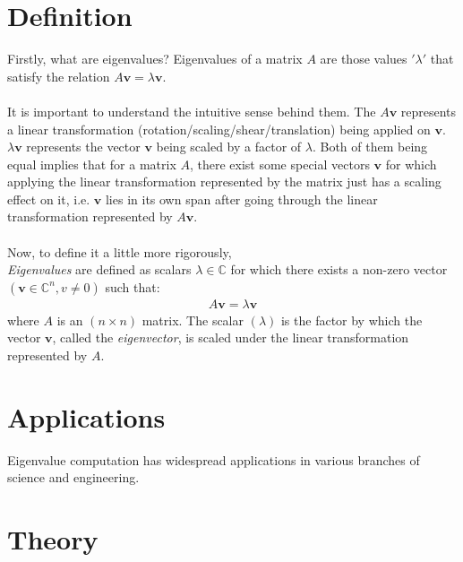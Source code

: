 \documentclass[12pt]{article}
\begin{document}
\section{Definition}
Firstly, what are eigenvalues? Eigenvalues of a matrix $A$ are those values $'\lambda'$ that satisfy the relation $A\mathbf{v}=\lambda\mathbf{v}$.\\\\
It is important to understand the intuitive sense behind them. The $A\mathbf{v}$ represents a linear transformation (rotation/scaling/shear/translation) being applied on $\mathbf{v}$. $\lambda\mathbf{v}$ represents the vector $\mathbf{v}$ being scaled by a factor of $\lambda$. Both of them being equal implies that for a matrix $A$, there exist some special vectors $\mathbf{v}$ for which applying the linear transformation represented by the matrix just has a scaling effect on it, i.e. $\mathbf{v}$ lies in its own span after going through the linear transformation represented by $A\mathbf{v}$.\\\\

Now, to define it a little more rigorously,\\ 
\textit{Eigenvalues} are defined as scalars \( \lambda \in \mathbb{C} \) for which there exists a non-zero vector $( \mathbf{v} \in \mathbb{C}^n, v \ne 0)$ such that:
\begin{align*}
A \mathbf{v} = \lambda \mathbf{v}
\end{align*}
where $ A $ is an $(n \times n)$ matrix. The scalar $(\lambda)$ is the factor by which the vector $\mathbf{v}$, called the \textit{eigenvector}, is scaled under the linear transformation represented by \( A \).


\section{Applications}
Eigenvalue computation has widespread applications in various branches of science and engineering.

\section{Theory}
\end{document}
